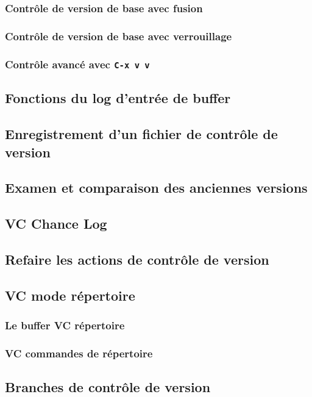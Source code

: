 \subsubsection{Contrôle de version de base avec fusion}
\subsubsection{Contrôle de version de base avec verrouillage}
\subsubsection{Contrôle avancé avec \texttt{C-x v v}}
\subsection{Fonctions du log d'entrée de buffer}\label{chap25sec1subsec4}
\subsection{Enregistrement d'un fichier de contrôle de
  version}\label{chap25sec1subsec5} 
\subsection{Examen et comparaison des anciennes
  versions}\label{chap25sec1subsec6}  
\subsection{VC Chance Log}\label{chap25sec1subsec7} 
\subsection{Refaire les actions de contrôle de
  version}\label{chap25sec1subsec8}  
\subsection{VC mode répertoire}\label{chap25sec1subsec9} 
\subsubsection{Le buffer VC répertoire}
\subsubsection{VC commandes de répertoire}
\subsection{Branches de contrôle de version}\label{chap25sec1subsec10} 
